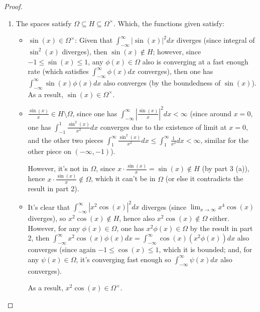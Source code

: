 \documentclass{article}
\begin{document}
\begin{proof}
\begin{enumerate}
        \hfil

        \item The spaces satisfy $\Omega \subseteq H \subseteq \Omega^\times$. Which, the functions given satisfy:
        \begin{itemize}
            \item[(a)] $\sin(x)\in\Omega^\times$: Given that $\int_{-\infty}^{\infty}|\sin(x)|^2 dx$ diverges (since integral of $\sin^2(x)$ diverges), then $\sin(x)\notin H$; however, since $-1\leq \sin(x)\leq 1$, any $\phi(x)\in \Omega$ also is converging at a fast enough rate (which satisfies $\int_{-\infty}^{\infty}\phi(x)dx$ converges), then one has $\int_{-\infty}^{\infty}\sin(x)\phi(x)dx$ also converges (by the boundedness of $\sin(x)$). As a result, $\sin(x)\in \Omega^\times$.
            
            \hfil

            \item[(b)] $\frac{\sin(x)}{x}\in H\setminus \Omega$, since one has $\int_{-\infty}^{\infty}\left|\frac{\sin(x)}{x}\right|^2 dx<\infty$ (since around $x=0$, one has $\int_{-1}^{1}\frac{\sin^2(x)}{x^2}dx$ converges due to the existence of limit at $x=0$, and the other two pieces $\int_{1}^{\infty}\frac{\sin^2(x)}{x^2}dx\leq \int_{1}^{\infty}\frac{1}{x^2}dx < \infty$, similar for the other piece on $(-\infty,-1)$).
            
            However, it's not in $\Omega$, since $x\cdot\frac{\sin(x)}{x}=\sin(x)\notin H$ (by part 3 (a)), hence $x\cdot\frac{\sin(x)}{x}\notin \Omega$, which it can't be in $\Omega$ (or else it contradicts the result in part 2).
            
            \hfil

            \item[(c)] It's clear that $\int_{-\infty}^{\infty}|x^2\cos(x)|^2 dx$ diverges (since $\lim_{x\rightarrow\infty}x^4\cos(x)$ diverges), so $x^2\cos(x)\notin H$, hence also $x^2\cos(x)\notin \Omega$ either. However, for any $\phi(x)\in \Omega$, one has $x^2\phi(x)\in \Omega$ by the result in part 2, then $\int_{-\infty}^{\infty}x^2\cos(x)\phi(x)dx = \int_{-\infty}^{\infty}\cos(x)\left(x^2\phi(x)\right)dx$ also converges (since again $-1\leq \cos(x)\leq 1$, which it is bounded; and, for any $\psi(x)\in \Omega$, it's converging fast enough so $\int_{-\infty}^{\infty}\psi(x)dx$ also converges).
            
            As a result, $x^2\cos(x)\in\Omega^\times$.
            
            \hfil


\end{itemize}
\end{enumerate}
\end{proof}
\end{document}
